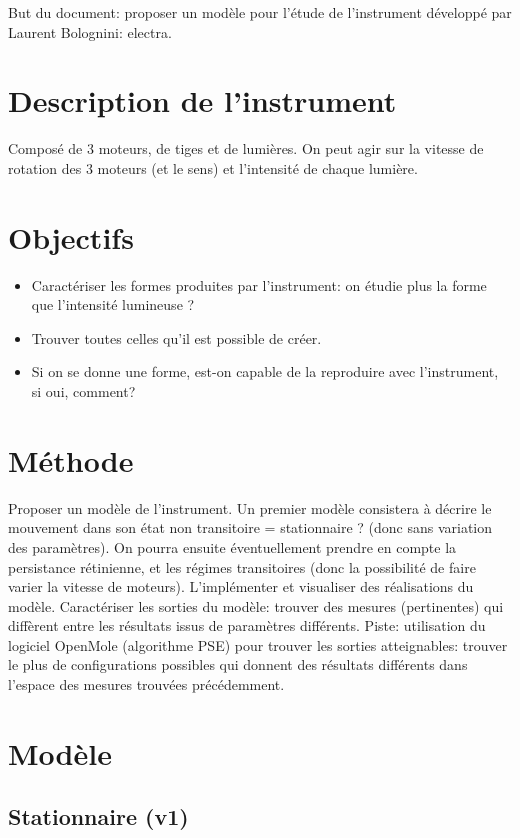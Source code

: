 \documentclass[11pt,a4paper]{article}
\begin{document}
But du document: proposer un modèle pour l'étude de l'instrument développé par Laurent Bolognini: electra.

\section{Description de l'instrument}
Composé de 3 moteurs, de tiges et de lumières.
On peut agir sur la vitesse de rotation des 3 moteurs (et le sens) et l'intensité de chaque lumière.


\section{Objectifs}
\begin{itemize}
\item Caractériser les formes produites par l'instrument: on étudie plus la forme que l'intensité lumineuse ?
\item Trouver toutes celles qu'il est possible de créer.
\item Si on se donne une forme, est-on capable de la reproduire avec l'instrument, si oui, comment?
\end{itemize}

\section{Méthode}
Proposer un modèle de l'instrument. Un premier modèle consistera à décrire le mouvement dans son état non transitoire = stationnaire ? (donc sans variation des paramètres).
On pourra ensuite éventuellement prendre en compte la persistance rétinienne, et les régimes transitoires (donc la possibilité de faire varier la vitesse de moteurs).
L'implémenter et visualiser des réalisations du modèle.
Caractériser les sorties du modèle: trouver des mesures (pertinentes) qui diffèrent entre les résultats issus de paramètres différents.
Piste: utilisation du logiciel OpenMole (algorithme PSE) pour trouver les sorties atteignables: trouver le plus de configurations possibles qui donnent des résultats différents dans l'espace des mesures trouvées précédemment.



\section{Modèle}

\subsection{Stationnaire (v1)}
\end{document}

